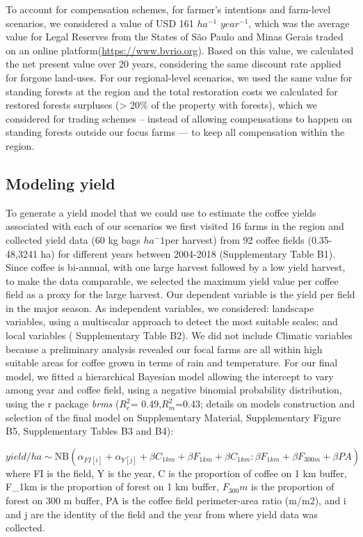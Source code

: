 \documentclass[
	12pt,				%
	oneside,			%
	a4paper,			%
	chapter=TITLE,		%
	section=TITLE,		%
	brazil,			%
	english				%
	]{abntex2}
\begin{document}
To account for compensation schemes, for farmer's intentions and farm-level scenarios, we considered a value of USD 161 \(ha^{-1}\) \(year^{-1}\), which was the average value for Legal Reserves from the States of São Paulo and Minas Gerais traded on an online platform(\url{https://www.bvrio.org}). Based on this value, we calculated the net present value over 20 years, considering the same discount rate applied for forgone land-uses. For our regional-level scenarios, we used the same value for standing forests at the region and the total restoration costs we calculated for restored forests surpluses (\textgreater{} 20\% of the property with forests), which we considered for trading schemes -- instead of allowing compensations to happen on standing forests outside our focus farms --- to keep all compensation within the region.

\hypertarget{modeling-yield}{%
\subsection{Modeling yield}\label{modeling-yield}}

To generate a yield model that we could use to estimate the coffee yields associated with each of our scenarios we first visited 16 farms in the region and collected yield data (60 kg bags \(ha^-1\)per harvest) from 92 coffee fields (0.35- 48,3241 ha) for different years between 2004-2018 (Supplementary Table B1). Since coffee is bi-annual, with one large harvest followed by a low yield harvest, to make the data comparable, we selected the maximum yield value per coffee field as a proxy for the large harvest. Our dependent variable is the yield per field in the major season. As independent variables, we considered: landscape variables, using a multiscalar approach to detect the most suitable scales; and local variables ( Supplementary Table B2). We did not include Climatic variables because a preliminary analysis revealed our focal farms are all within high suitable areas for coffee grown in terms of rain and temperature. For our final model, we fitted a hierarchical Bayesian model allowing the intercept to vary among year and coffee field, using a negative binomial probability distribution, using the r package \emph{brms} \autocite{burkner_brms_nodate} (\(R_c^2\)= 0.49,\(R_m^2\)=0.43; details on models construction and selection of the final model on Supplementary Material, Supplementary Figure B5, Supplementary Tables B3 and B4):

\[ yield/ha \sim \text{NB}(\alpha_{FI[i]}+\alpha_{Y[j]} + \beta C_{1km} + \beta F_{1km} + \beta C_{1km}: \beta F_{1km}+ \beta F_{300m} +  \beta PA)  \]
where FI is the field, Y is the year, C is the proportion of coffee on 1 km buffer, F\_1km is the proportion of forest on 1 km buffer, \(F_300m\) is the proportion of forest on 300 m buffer, PA is the coffee field perimeter-area ratio (m/m2), and i and j are the identity of the field and the year from where yield data was collected.
\end{document}
